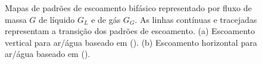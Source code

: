 \begin{figure}[ht!]
	\hspace{0.2cm}
	\caption[Mapas de padrões de escoamento bifásico.]{Mapas de padrões
	de escoamento bifásico representado por fluxo de massa $G$ de
	líquido $G_L$ e de gás $G_G$. As linhas contínuas e tracejadas
	representam a transição dos padrões de escoamento. (a) Escoamento
	vertical para ar/água baseado em (\cite{hewitt1969}). (b) Escoamento
	horizontal para ar/água baseado em (\cite{baker1954}).}
	\label{fig:map} 
\end{figure}


